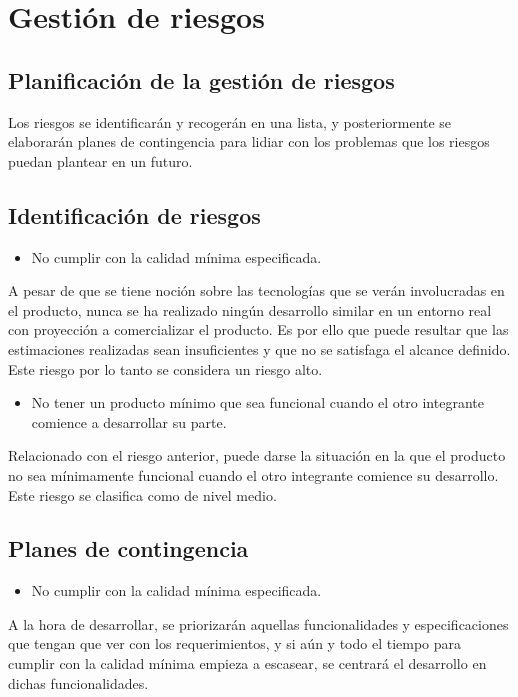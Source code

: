 \section{Gestión de riesgos}
\subsection{Planificación de la gestión de riesgos}
Los riesgos se identificarán y recogerán en una lista, y posteriormente
se elaborarán planes de contingencia para lidiar con los problemas que
los riesgos puedan plantear en un futuro.

\subsection{Identificación de riesgos}
\label{section:risks}
\begin{itemize}
    \item No cumplir con la calidad mínima especificada.
\end{itemize}
A pesar de que se tiene noción sobre las tecnologías que se verán
involucradas en el producto, nunca se ha realizado ningún desarrollo
similar en un entorno real con proyección a comercializar el producto.
Es por ello que puede resultar que las estimaciones realizadas sean
insuficientes y que no se satisfaga el alcance definido. Este riesgo
por lo tanto se considera un riesgo alto.

\begin{itemize}
    \item No tener un producto mínimo que sea funcional cuando el otro
        integrante comience a desarrollar su parte.
\end{itemize}
Relacionado con el riesgo anterior, puede darse la situación en la que
el producto no sea mínimamente funcional cuando el otro integrante
comience su desarrollo. Este riesgo se clasifica como de nivel medio.

\subsection{Planes de contingencia}
\label{section:continplans}
\begin{itemize}
    \item No cumplir con la calidad mínima especificada.
\end{itemize}
A la hora de desarrollar, se priorizarán aquellas funcionalidades y
especificaciones que tengan que ver con los requerimientos, y si aún y
todo el tiempo para cumplir con la calidad mínima empieza a escasear,
se centrará el desarrollo en dichas funcionalidades.

